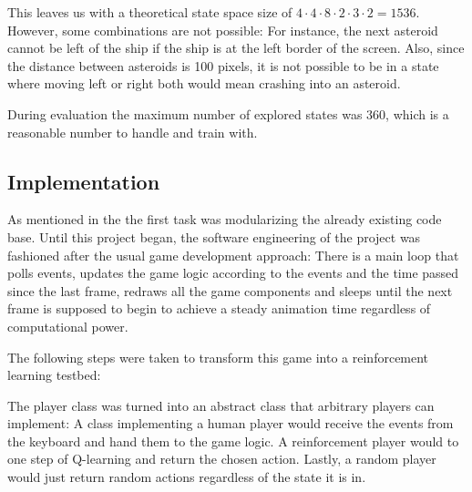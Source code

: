 \documentclass[a4paper,10pt]{article}
\begin{document}

This leaves us with a theoretical state space size of $4 \cdot 4 \cdot 8 \cdot 2 \cdot 3 \cdot 2 = 1536$.
However, some combinations are not possible: For instance, the next asteroid cannot be left of the ship if the ship is at the left border of the screen.
Also, since the distance between asteroids is 100 pixels, it is not possible to be in a state where moving left or right both would mean crashing into an asteroid.

During evaluation the maximum number of explored states was $360$, which is a reasonable number to handle and train with.



\subsection{Implementation}

As mentioned in the  the first task was modularizing the already existing code base.
Until this project began, the software engineering of the project was fashioned after the usual game development approach:
There is a main loop that polls events, updates the game logic according to the events and the time passed since the last frame, redraws all the game components and sleeps until the next frame is supposed to begin to achieve a steady animation time regardless of computational power.

The following steps were taken to transform this game into a reinforcement learning testbed:

The player class was turned into an abstract class that arbitrary players can implement: A class implementing a human player would receive the events from the keyboard and hand them to the game logic.
A reinforcement player would to one step of Q-learning and return the chosen action.
Lastly, a random player would just return random actions regardless of the state it is in.
\end{document}
